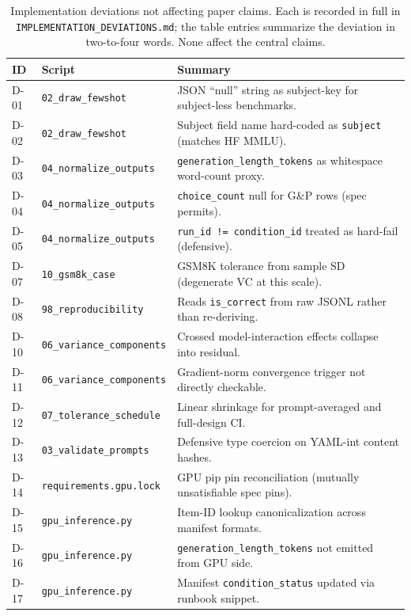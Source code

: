 \documentclass[11pt]{article}
\begin{document}
\begin{table}[h]
\centering
\small
\caption{Implementation deviations not affecting paper claims. Each is recorded in full in \texttt{IMPLEMENTATION\_DEVIATIONS.md}; the table entries summarize the deviation in two-to-four words. None affect the central claims.}
\label{tab:deviations-benign}
\begin{tabular}{lp{}p{}}
\toprule
ID & Script & Summary \\
\midrule
D-01 & \texttt{02\_draw\_fewshot} & JSON ``null'' string as subject-key for subject-less benchmarks. \\
D-02 & \texttt{02\_draw\_fewshot} & Subject field name hard-coded as \texttt{subject} (matches HF MMLU). \\
D-03 & \texttt{04\_normalize\_outputs} & \texttt{generation\_length\_tokens} as whitespace word-count proxy. \\
D-04 & \texttt{04\_normalize\_outputs} & \texttt{choice\_count} null for G\&P rows (spec permits). \\
D-05 & \texttt{04\_normalize\_outputs} & \texttt{run\_id != condition\_id} treated as hard-fail (defensive). \\
D-07 & \texttt{10\_gsm8k\_case} & GSM8K tolerance from sample SD (degenerate VC at this scale). \\
D-08 & \texttt{98\_reproducibility} & Reads \texttt{is\_correct} from raw JSONL rather than re-deriving. \\
D-10 & \texttt{06\_variance\_components} & Crossed model-interaction effects collapse into residual. \\
D-11 & \texttt{06\_variance\_components} & Gradient-norm convergence trigger not directly checkable. \\
D-12 & \texttt{07\_tolerance\_schedule} & Linear shrinkage for prompt-averaged and full-design CI. \\
D-13 & \texttt{03\_validate\_prompts} & Defensive type coercion on YAML-int content hashes. \\
D-14 & \texttt{requirements.gpu.lock} & GPU pip pin reconciliation (mutually unsatisfiable spec pins). \\
D-15 & \texttt{gpu\_inference.py} & Item-ID lookup canonicalization across manifest formats. \\
D-16 & \texttt{gpu\_inference.py} & \texttt{generation\_length\_tokens} not emitted from GPU side. \\
D-17 & \texttt{gpu\_inference.py} & Manifest \texttt{condition\_status} updated via runbook snippet. \\
\bottomrule
\end{tabular}
\end{table}
\end{document}
